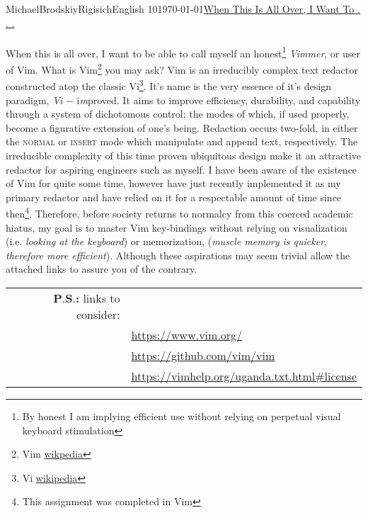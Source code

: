 \documentclass[12pt,letterpaper]{article}
\begin{document}
\begin{mla}{Michael}{Brodskiy}{Rigisich}{English 10}{\today}{\underline{When This Is All Over, I Want To . . .}} 

  \begin{justifying}

    \paragraph{} When this is all over, I want to be able to call myself an honest\footnote{By honest I am implying efficient use without relying on perpetual visual keyboard stimulation} \emph{Vimmer}, or user of Vim. What is Vim\footnote{Vim \href{https://en.wikipedia.org/wiki/Vim_(text_editor)}{wikpedia}} you may ask? Vim is an irreducibly complex text redactor constructed atop the classic Vi\footnote{Vi \href{https://en.wikipedia.org/wiki/Vi}{wikipedia}}. It's name is the very essence of it's design paradigm, \emph{Vi} $-$ i\emph{m}proved. It aims to improve efficiency, durability, and capability through a system of dichotomous control; the modes of which, if used properly, become a figurative extension of one's being. Redaction occurs two-fold, in either the \textsc{normal} or \textsc{insert} mode which manipulate and append text, respectively. The irreducible complexity of this time proven ubiquitous design make it an attractive redactor for aspiring engineers such as myself. I have been aware of the existence of Vim for quite some time, however have just recently implemented it as my primary redactor and have relied on it for a respectable amount of time since then\footnote{This assignment was completed in Vim}. Therefore, before society returns to normalcy from this coerced academic hiatus, my goal is to master Vim key-bindings without relying on visualization (i.e. \emph{looking at the keyboard}) or memorization, (\emph{muscle memory is quicker}, \emph{therefore more efficient}). Although these aspirations may seem trivial allow the attached links to assure you of the contrary. \\ 
      
\end{justifying}

\vspace{12pt}   

\begin{tabular}{rl}
 \textbf{P}.\textbf{S}.\textbf{:} links to consider: & \\
 & \url{https://www.vim.org/} \\  
 & \url{https://github.com/vim/vim} \\  
 & \url{https://vimhelp.org/uganda.txt.html#license} \\

\end{tabular}

\end{mla}
\end{document}
